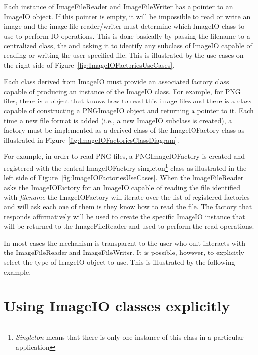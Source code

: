 Each instance of ImageFileReader and ImageFileWriter has
a pointer to an ImageIO object. If this pointer is empty, it will
be impossible to read or write an image and the image file reader/writer must
determine which ImageIO class to use to perform IO operations.
This is done basically by passing the filename to a centralized class, the
 and asking it to identify any subclass of
ImageIO capable of reading or writing the user-specified file. This
is illustrated by the use cases on the right side of
Figure~\ref{fig:ImageIOFactoriesUseCases}.

Each class derived from ImageIO must provide an associated factory
class capable of producing an instance of the ImageIO class. For
example, for PNG files, there is a  object that knows how
to read this image files and there is a  class
capable of constructing a PNGImageIO object and returning a pointer
to it.  Each time a new file format is added (i.e., a new ImageIO
subclass is created), a factory must be implemented as a derived class of the
ImageIOFactory class as illustrated in
Figure~\ref{fig:ImageIOFactoriesClassDiagram}.

For example, in order to read PNG files, a PNGImageIOFactory is
created and registered with the central ImageIOFactory
singleton\footnote{\emph{Singleton} means that there is only one instance of
this class in a particular application} class as illustrated in the left side
of Figure~\ref{fig:ImageIOFactoriesUseCases}. When the ImageFileReader asks
the ImageIOFactory for an ImageIO capable of reading the
file identified with \emph{filename} the ImageIOFactory will iterate over the
list of registered factories and will ask each one of them is they know how
to read the file. The factory that responds affirmatively will be used to
create the specific ImageIO instance that will be returned to the
ImageFileReader and used to perform the read operations.

In most cases the mechanism is transparent to the user who onlt interacts
with the ImageFileReader and ImageFileWriter. It is
possible, however, to explicitly select the type of ImageIO object
to use.  This is illustrated by the following example.


\section{Using ImageIO classes explicitly}
\label{sec:ImageReadExportVTK}




